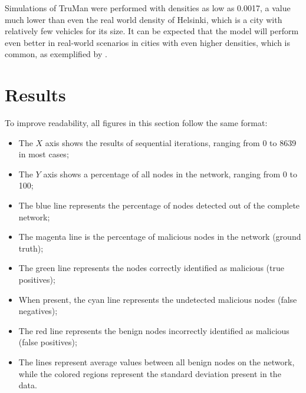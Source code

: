 Simulations of TruMan were performed with densities as low as 0.0017, a value much lower than even the real world density of Helsinki, which is a city with relatively few vehicles for its size.
It can be expected that the model will perform even better in real-world scenarios in cities with even higher densities, which is common, as exemplified by .

%

\section{Results}
\label{section:results}

To improve readability, all figures in this section follow the same format:
\begin{itemize}
	\item The $X$ axis shows the results of sequential iterations, ranging from 0 to 8639 in most cases;
	\item The $Y$ axis shows a percentage of all nodes in the network, ranging from 0 to 100;
	\item The blue line represents the percentage of nodes detected out of the complete network;
	\item The magenta line is the percentage of malicious nodes in the network (ground truth);
	\item The green line represents the nodes correctly identified as malicious (true positives);
	\item When present, the cyan line represents the undetected malicious nodes (false negatives); 
	\item The red line represents the benign nodes incorrectly identified as malicious (false positives);
	\item The lines represent average values between all benign nodes on the network, while the colored regions represent the standard deviation present in the data.
\end{itemize}


